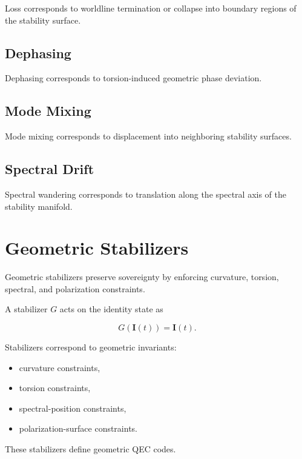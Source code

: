 \documentclass[12pt,twoside]{article}
\begin{document}
Loss corresponds to worldline termination or collapse into boundary regions of the stability
surface.

\subsection{Dephasing}

Dephasing corresponds to torsion-induced geometric phase deviation.

\subsection{Mode Mixing}

Mode mixing corresponds to displacement into neighboring stability surfaces.

\subsection{Spectral Drift}

Spectral wandering corresponds to translation along the spectral axis of the stability
manifold.

\section{Geometric Stabilizers}

Geometric stabilizers preserve sovereignty by enforcing curvature, torsion, spectral, and
polarization constraints.

A stabilizer $G$ acts on the identity state as



\[
G(\mathbf{I}(t)) = \mathbf{I}(t).
\]



Stabilizers correspond to geometric invariants:

\begin{itemize}
    \item curvature constraints,
    \item torsion constraints,
    \item spectral-position constraints,
    \item polarization-surface constraints.
\end{itemize}

These stabilizers define geometric QEC codes.

\end{document}
